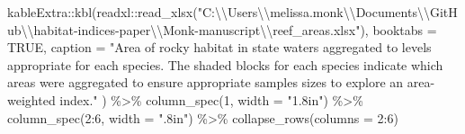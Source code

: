 \documentclass[
  authoryear,
  preprint,
  3p]{elsarticle}
\newenvironment{Shaded}{\begin{snugshade}}{\end{snugshade}}
\newcommand{\AttributeTok}[1]{\textcolor[rgb]{0.40,0.45,0.13}{#1}}
\newcommand{\ConstantTok}[1]{\textcolor[rgb]{0.56,0.35,0.01}{#1}}
\newcommand{\DecValTok}[1]{\textcolor[rgb]{0.68,0.00,0.00}{#1}}
\newcommand{\FunctionTok}[1]{\textcolor[rgb]{0.28,0.35,0.67}{#1}}
\newcommand{\NormalTok}[1]{\textcolor[rgb]{0.00,0.23,0.31}{#1}}
\newcommand{\SpecialCharTok}[1]{\textcolor[rgb]{0.37,0.37,0.37}{#1}}
\newcommand{\StringTok}[1]{\textcolor[rgb]{0.13,0.47,0.30}{#1}}
\begin{document}
\begin{Shaded}
\begin{Highlighting}[]
\NormalTok{kableExtra}\SpecialCharTok{::}\FunctionTok{kbl}\NormalTok{(readxl}\SpecialCharTok{::}\FunctionTok{read\_xlsx}\NormalTok{(}\StringTok{"C:}\SpecialCharTok{\textbackslash{}\textbackslash{}}\StringTok{Users}\SpecialCharTok{\textbackslash{}\textbackslash{}}\StringTok{melissa.monk}\SpecialCharTok{\textbackslash{}\textbackslash{}}\StringTok{Documents}\SpecialCharTok{\textbackslash{}\textbackslash{}}\StringTok{GitHub}\SpecialCharTok{\textbackslash{}\textbackslash{}}\StringTok{habitat{-}indices{-}paper}\SpecialCharTok{\textbackslash{}\textbackslash{}}\StringTok{Monk{-}manuscript}\SpecialCharTok{\textbackslash{}\textbackslash{}}\StringTok{reef\_areas.xlsx"}\NormalTok{),}
                \AttributeTok{booktabs =} \ConstantTok{TRUE}\NormalTok{,}
                \AttributeTok{caption =} \StringTok{"Area of rocky habitat in state waters aggregated to }
\StringTok{                levels appropriate for each species. The shaded }
\StringTok{                blocks for each species indicate which areas were aggregated to}
\StringTok{                ensure appropriate samples sizes to explore an area{-}weighted index."}
\NormalTok{                ) }\SpecialCharTok{\%\textgreater{}\%}
  \FunctionTok{column\_spec}\NormalTok{(}\DecValTok{1}\NormalTok{, }\AttributeTok{width =} \StringTok{"1.8in"}\NormalTok{)  }\SpecialCharTok{\%\textgreater{}\%}
  \FunctionTok{column\_spec}\NormalTok{(}\DecValTok{2}\SpecialCharTok{:}\DecValTok{6}\NormalTok{, }\AttributeTok{width =} \StringTok{".8in"}\NormalTok{)  }\SpecialCharTok{\%\textgreater{}\%}
  \FunctionTok{collapse\_rows}\NormalTok{(}\AttributeTok{columns =} \DecValTok{2}\SpecialCharTok{:}\DecValTok{6}\NormalTok{)}
\end{Highlighting}
\end{Shaded}
\end{document}

